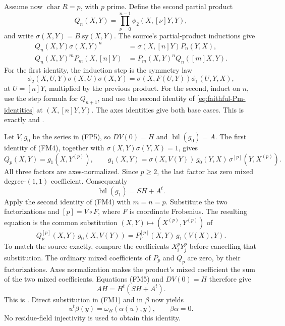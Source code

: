 Assume now \(\operatorname{char}R=p\), with \(p\) prime.
Define the second partial product
\[
                  Q_n(X,Y)=\prod_{\nu=0}^{n-1}
                                      \phi_2(X,[\nu]Y,Y),
\]
and write \(\sigma(X,Y)=B.\mathrm{sy}(X,Y)\).
The source's partial-product inductions give
\[
 \begin{split}
 Q_n(X,Y)\sigma(X,Y)^n
      &=\sigma(X,[n]Y)P_n(Y,X),\\
 Q_n(X,Y)^m P_m(X,[n]Y)
      &=P_m(X,Y)^nQ_n([m]X,Y).
 \end{split}
 \tag{FM4}\label{eq:faithful-two-partial-products}
\]
For the first identity, the induction step is the
symmetry law
\[
 \phi_2(X,U,Y)\sigma(X,U)\sigma(X,Y)
                         =\sigma(X,F(U,Y))\phi_1(U,Y,X),
\]
at \(U=[n]Y\), multiplied by the previous product.
For the second, induct on \(n\), use the step formula
for \(Q_{n+1}\), and use the second identity of
\eqref{eq:faithful-Pm-identities} at
\((X,[n]Y,Y)\).
The axes identities give both base cases.
This is exactly  and
.

Let \(V,g_0\) be the series in (FP5), so
\(DV(0)=H\) and \(\operatorname{bil}(g_0)=A\).
The first identity of (FM4), together with
\(\sigma(X,Y)\sigma(Y,X)=1\), gives
\[
 Q_p(X,Y)=g_1(X,Y^{(p)}),\qquad
 g_1(X,Y)=
   \sigma(X,V(Y))\,g_0(Y,X)\,\sigma^{[p]}(Y,X^{(p)}).
\]
All three factors are axes-normalized.
Since \(p\ge2\), the last factor has zero mixed
degree-\((1,1)\) coefficient.
Consequently
\[
                       \operatorname{bil}(g_1)=SH+A^t.
 \tag{FM5}\label{eq:faithful-g1-bilinear}
\]
Apply the second identity of (FM4) with \(m=n=p\).
Substitute the two factorizations and \([p]=V\circ F\),
where \(F\) is coordinate Frobenius.
The resulting equation is the common substitution
\((X,Y)\mapsto(X^{(p)},Y^{(p)})\) of
\[
 Q_p^{[p]}(X,Y)\,g_0(X,V(Y))
                  =P_p^{[p]}(X,Y)\,g_1(V(X),Y).
\]
To match the source exactly, compare the coefficients
\(X_i^pY_j^p\) before cancelling that substitution.
The ordinary mixed coefficients of \(P_p\) and \(Q_p\)
are zero, by their factorizations.
Axes normalization makes the product's mixed coefficient
the sum of the two mixed coefficients.
Equations (FM5) and \(DV(0)=H\) therefore give
\[
                           AH=H^t(SH+A^t).
 \tag{FM6}\label{eq:faithful-isotropy-matrix}
\]
This is .
Direct substitution in (FM1) and in \(\beta\) now yields
\[
       u^t\beta(y)=\omega_B(\alpha(u),y),
               \qquad \beta\alpha=0 .
 \tag{FM7}\label{eq:faithful-alpha-beta-adjoint-zero}
\]
No residue-field injectivity is used to obtain this identity.

